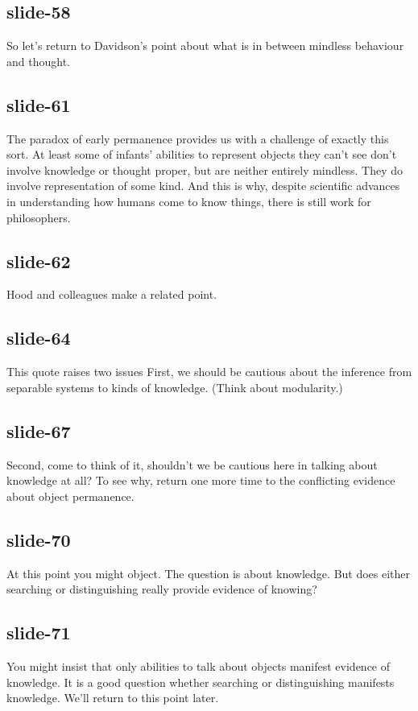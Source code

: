 \documentclass[12pt,\papersize]{extarticle}
\begin{document}
 
\subsection{slide-58}
So let's return to Davidson's point about what is in between mindless behaviour and thought.
 
 
\subsection{slide-61}
The paradox of early permanence provides us with a challenge of exactly this sort.
At least some of infants' abilities to represent objects they can't see don't involve knowledge or thought proper, but are neither entirely mindless. They do involve representation of some kind.
And this is why, despite scientific advances in understanding how humans come to know things, there is still work for philosophers.
 
 
\subsection{slide-62}
Hood and colleagues make a related point.
 
 
\subsection{slide-64}
This quote raises two issues
First, we should be cautious about the inference from separable systems to kinds of knowledge. (Think about modularity.)
 
 
\subsection{slide-67}
Second, come to think of it, shouldn't we be cautious here in talking about knowledge at all?
To see why, return one more time to the conflicting evidence about object permanence.
 
 
\subsection{slide-70}
At this point you might object. The question is about knowledge. But does either searching or distinguishing really provide evidence of knowing?
 
 
\subsection{slide-71}
You might insist that only abilities to talk about objects manifest evidence of knowledge.
It is a good question whether searching or distinguishing manifests knowledge.
We'll return to this point later.
 
\end{document}
